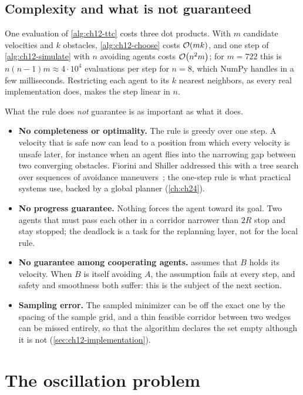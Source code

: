 \subsection{Complexity and what is not guaranteed}

One evaluation of \cref{alg:ch12-ttc} costs three dot products. With $m$
candidate velocities and $k$ obstacles, \cref{alg:ch12-choose} costs
$\mathcal{O}\!\left(mk\right)$, and one step of \cref{alg:ch12-simulate} with $n$ avoiding agents
costs $\mathcal{O}\!\left(n^2 m\right)$; for $m = 722$ this is $n(n-1)m \approx 4 \cdot 10^4$
evaluations per step for $n = 8$, which NumPy handles in a few milliseconds. Restricting
each agent to its $k$ nearest neighbors, as every real implementation does,
makes the step linear in $n$.

What the rule does \emph{not} guarantee is as important as what it does.
\begin{itemize}
  \item \textbf{No completeness or optimality.} The rule is greedy over one
  step. A velocity that is safe now can lead to a position from which every
  velocity is unsafe later, for instance when an agent flies into the
  narrowing gap between two converging obstacles. Fiorini and Shiller
  addressed this with a tree search over sequences of avoidance
  maneuvers~\cite{fiorini1998motion}; the one-step rule is what practical
  systems use, backed by a global planner (\cref{ch:ch24}).
  \item \textbf{No progress guarantee.} Nothing forces the agent toward its
  goal. Two agents that must pass each other in a corridor narrower than
  $2R$ stop and stay stopped; the deadlock is a task for the replanning
  layer, not for the local rule.
  \item \textbf{No guarantee among cooperating agents.} 
  assumes that $B$ holds its velocity. When $B$ is itself avoiding $A$, the
  assumption fails at every step, and safety and smoothness both suffer:
  this is the subject of the next section.
  \item \textbf{Sampling error.} The sampled minimizer can be off the exact
  one by the spacing of the sample grid, and a thin feasible corridor between
  two wedges can be missed entirely, so that the algorithm declares the set
  empty although it is not (\cref{sec:ch12-implementation}).
\end{itemize}

\section{The oscillation problem}
\label{sec:ch12-oscillation}

